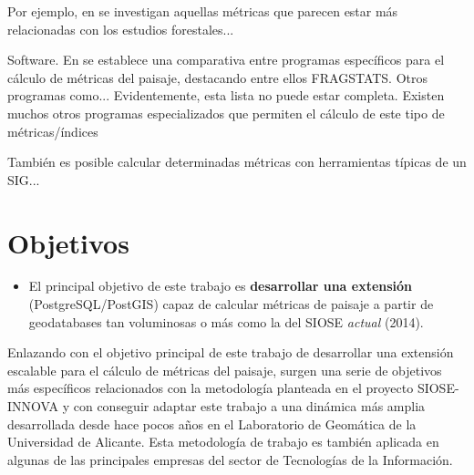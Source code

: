 Por ejemplo, en \cite{Uuemaa2017} se investigan aquellas métricas que parecen estar más relacionadas con los estudios forestales...

Software.  En \cite{Zaragozi2012} se establece una comparativa entre programas específicos para el cálculo de métricas del paisaje, destacando entre ellos FRAGSTATS. Otros programas como... Evidentemente, esta lista no puede estar completa. Existen muchos otros programas especializados que permiten el cálculo de este tipo de métricas/índices

También es posible calcular determinadas métricas con herramientas típicas de un SIG...




\section{Objetivos}

\begin{graybox}
\begin{itemize}
\item El principal objetivo de este trabajo es \textbf{desarrollar una extensión} (PostgreSQL/PostGIS) capaz de calcular métricas de paisaje a partir de geodatabases tan voluminosas o más como la del SIOSE \textit{actual} (2014).
\end{itemize}
\end{graybox}

Enlazando con el objetivo principal de este trabajo de desarrollar una extensión escalable para el cálculo de métricas del paisaje, surgen una serie de objetivos más específicos relacionados con la metodología planteada en el proyecto SIOSE-INNOVA y con conseguir adaptar este trabajo a una dinámica más amplia desarrollada desde hace pocos años en el Laboratorio de Geomática de la Universidad de Alicante. Esta metodología de trabajo es también aplicada en algunas de las principales empresas del sector de Tecnologías de la Información.

